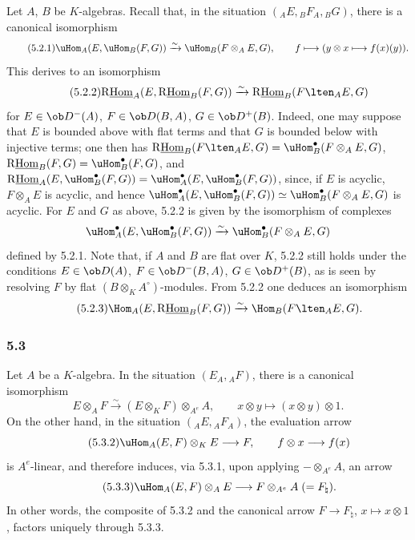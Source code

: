 Let $A$, $B$ be $K$-algebras. Recall that, in the situation $({}_AE,{}_BF_A,{}_BG)$, there is a canonical isomorphism
\begin{equation}\tag{5.2.1}
\uHom_A(E,\uHom_B(F,G))\xrightarrow{\sim}\uHom_B(F\otimes_AE,G),\qquad
f\longmapsto (y\otimes x\longmapsto f(x)(y)).
\end{equation}
This derives to an isomorphism
\begin{equation}\tag{5.2.2}
\mathrm{R}\underline{\mathrm{Hom}}_A(E,\mathrm{R}\underline{\mathrm{Hom}}_B(F,G))\xrightarrow{\sim}\mathrm{R}\underline{\mathrm{Hom}}_B(F\lten_AE,G)
\end{equation}
for $E\in\ob D^-(A)$, $F\in\ob D(B,A)$, $G\in\ob D^+(B)$. Indeed, one may suppose that $E$ is bounded above with flat terms and that $G$ is bounded below with injective terms; one then has $\mathrm{R}\underline{\mathrm{Hom}}_B(F\lten_AE,G)=\uHom_B^\bullet(F\otimes_AE,G)$, $\mathrm{R}\underline{\mathrm{Hom}}_B(F,G)=\uHom_B^\bullet(F,G)$, and $\mathrm{R}\underline{\mathrm{Hom}}_A(E,\uHom_B^\bullet(F,G))=\uHom_A^\bullet(E,\uHom_B^\bullet(F,G))$, since, if $E$ is acyclic, $F\otimes_AE$ is acyclic, and hence $\uHom_A^\bullet(E,\uHom_B^\bullet(F,G))\simeq\uHom_B^\bullet(F\otimes_AE,G)$ is acyclic. For $E$ and $G$ as above, 5.2.2 is given by the isomorphism of complexes
\[
\uHom_A^\bullet(E,\uHom_B^\bullet(F,G))\xrightarrow{\sim}\uHom_B^\bullet(F\otimes_AE,G)
\]
defined by 5.2.1. Note that, if $A$ and $B$ are flat over $K$, 5.2.2 still holds under the conditions $E\in\ob D(A)$, $F\in\ob D^-(B,A)$, $G\in\ob D^+(B)$, as is seen by resolving $F$ by flat $(B\otimes_KA^\circ)$-modules. From 5.2.2 one deduces an isomorphism
\begin{equation}\tag{5.2.3}
\Hom_A(E,\mathrm{R}\underline{\mathrm{Hom}}_B(F,G))\xrightarrow{\sim}\Hom_B(F\lten_AE,G).
\end{equation}

\subsubsection*{5.3}

Let $A$ be a $K$-algebra. In the situation $(E_A,{}_AF)$, there is a canonical isomorphism
\begin{equation}\tag{5.3.1}
E\otimes_AF\xrightarrow{\sim}(E\otimes_KF)\otimes_{A^e}A,
\qquad x\otimes y\longmapsto (x\otimes y)\otimes 1.
\end{equation}
On the other hand, in the situation $({}_AE,{}_AF_A)$, the evaluation arrow
\begin{equation}\tag{5.3.2}
\uHom_A(E,F)\otimes_KE\longrightarrow F,
\qquad f\otimes x\longrightarrow f(x)
\end{equation}
is $A^e$-linear, and therefore induces, via 5.3.1, upon applying $-\otimes_{A^e}A$, an arrow
\begin{equation}\tag{5.3.3}
\uHom_A(E,F)\otimes_AE\longrightarrow F\otimes_{A^e}A\;(=F_\natural).
\end{equation}
In other words, the composite of 5.3.2 and the canonical arrow $F\to F_\natural$, $x\mapsto x\otimes 1$, factors uniquely through 5.3.3.

